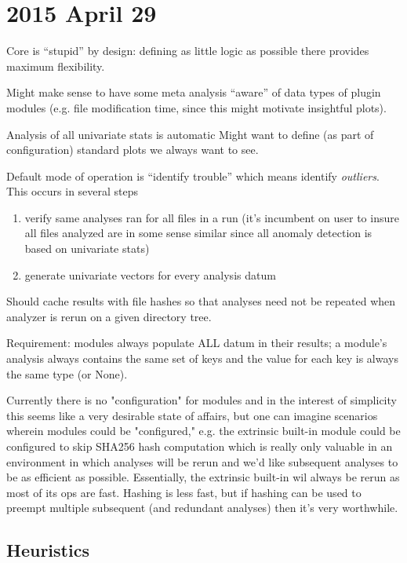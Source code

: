 \documentclass {article}
\begin{document}
\section{2015 April 29}
Core is ``stupid'' by design: defining as little logic as possible
there provides maximum flexibility.

Might make sense to have some meta analysis ``aware'' of data types
of plugin modules (e.g. file modification time, since this might 
motivate insightful plots).

Analysis of all univariate stats is automatic
Might want to define (as part of configuration) standard plots we
always want to see.

Default mode of operation is ``identify trouble'' which means identify
\emph{outliers}. This occurs in several steps
\begin{enumerate}
\item verify same analyses ran for all files in a run (it's incumbent
	on user to insure all files analyzed are in some sense similar
	since all anomaly detection is based on univariate stats)
\item generate univariate vectors for every analysis datum
\end{enumerate}

Should cache results with file hashes so that analyses need not
be repeated when analyzer is rerun on a given directory tree.

Requirement: modules always populate ALL datum in their results;
a module's analysis always contains the same set of keys and the
value for each key is always the same type (or None).

Currently there is no "configuration" for modules and in the interest
of simplicity this seems like a very desirable state of affairs, but
one can imagine scenarios wherein modules could be "configured," e.g.
the extrinsic built-in module could be configured to skip SHA256
hash computation which is really only valuable in an environment in
which analyses will be rerun and we'd like subsequent analyses to be
as efficient as possible. Essentially, the extrinsic built-in wil
always be rerun as most of its ops are fast. Hashing is less fast,
but if hashing can be used to preempt multiple subsequent (and
redundant analyses) then it's very worthwhile.

\subsection{Heuristics}
\end{document}
